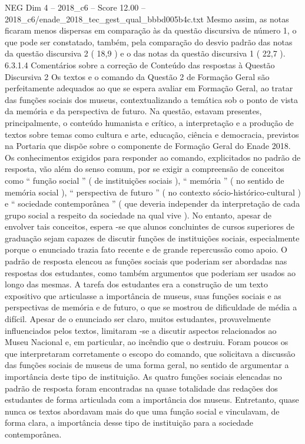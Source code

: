 \begin{textsample}{NEG Dim 4 – 2018\_c6 – Score 12.00 – 2018\_c6/enade\_2018\_tec\_gest\_qual\_bbbd005b4c.txt}
Mesmo assim, as notas ficaram menos dispersas em comparação às da questão discursiva de número 1, o que pode ser constatado, também, pela comparação do desvio padrão das notas da questão discursiva 2 ( 18,9 ) e o das notas da questão discursiva 1 ( 22,7 ). 6.3.1.4 Comentários sobre a correção de Conteúdo das respostas à Questão Discursiva 2 Os textos e o comando da Questão 2 de Formação Geral são perfeitamente adequados ao que se espera avaliar em Formação Geral, ao tratar das funções sociais dos museus, contextualizando a temática sob o ponto de vista da memória e da perspectiva de futuro.
Na questão, estavam presentes, principalmente, o conteúdo humanista e crítico, a interpretação e a produção de textos sobre temas como cultura e arte, educação, ciência e democracia, previstos na Portaria que dispõe sobre o componente de Formação Geral do Enade 2018.
Os conhecimentos exigidos para responder ao comando, explicitados no padrão de resposta, vão além do senso comum, por se exigir a compreensão de conceitos como “ função social ” ( de instituições sociais ), “ memória ” ( no sentido de memória social ), “ perspectiva de futuro ” ( no contexto sócio-histórico-cultural ) e “ sociedade contemporânea ” ( que deveria independer da interpretação de cada grupo social a respeito da sociedade na qual vive ).
No entanto, apesar de envolver tais conceitos, espera -se que alunos concluintes de cursos superiores de graduação sejam capazes de discutir funções de instituições sociais, especialmente porque o enunciado trazia fato recente e de grande repercussão como apoio.
O padrão de resposta elencou as funções sociais que poderiam ser abordadas nas respostas dos estudantes, como também argumentos que poderiam ser usados ao longo das mesmas.
A tarefa dos estudantes era a construção de um texto expositivo que articulasse a importância de museus, suas funções sociais e as perspectivas de memória e de futuro, o que se mostrou de dificuldade de média a difícil.
Apesar de o enunciado ser claro, muitos estudantes, provavelmente influenciados pelos textos, limitaram -se a discutir aspectos relacionados ao Museu Nacional e, em particular, ao incêndio que o destruiu.
Foram poucos os que interpretaram corretamente o escopo do comando, que solicitava a discussão das funções sociais de museus de uma forma geral, no sentido de argumentar a importância deste tipo de instituição.
As quatro funções sociais elencadas no padrão de resposta foram encontradas na quase totalidade das redações dos estudantes de forma articulada com a importância dos museus.
Entretanto, quase nunca os textos abordavam mais do que uma função social e vinculavam, de forma clara, a importância desse tipo de instituição para a sociedade contemporânea.

\end{textsample}
